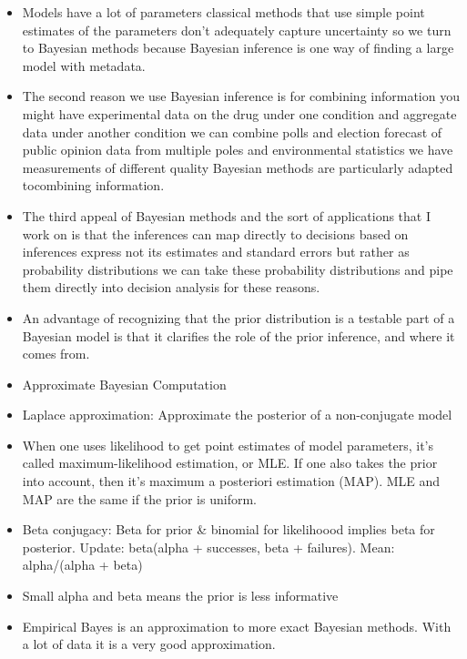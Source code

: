 \documentclass[]{book}
\theoremstyle{definition}
\theoremstyle{definition}
\theoremstyle{definition}
\theoremstyle{remark}
\begin{document}
\begin{itemize}
\item
  Models have a lot of parameters classical methods that use simple
  point estimates of the parameters don't adequately capture uncertainty
  so we turn to Bayesian methods because Bayesian inference is one way
  of finding a large model with metadata.
\item
  The second reason we use Bayesian inference is for combining
  information you might have experimental data on the drug under one
  condition and aggregate data under another condition we can combine
  polls and election forecast of public opinion data from multiple poles
  and environmental statistics we have measurements of different quality
  Bayesian methods are particularly adapted tocombining information.
\item
  The third appeal of Bayesian methods and the sort of applications that
  I work on is that the inferences can map directly to decisions based
  on inferences express not its estimates and standard errors but rather
  as probability distributions we can take these probability
  distributions and pipe them directly into decision analysis for these
  reasons.
\item
  An advantage of recognizing that the prior distribution is a testable
  part of a Bayesian model is that it clarifies the role of the prior
  inference, and where it comes from.
\item
  Approximate Bayesian Computation
\item
  Laplace approximation: Approximate the posterior of a non-conjugate
  model
\item
  When one uses likelihood to get point estimates of model parameters,
  it's called maximum-likelihood estimation, or MLE. If one also takes
  the prior into account, then it's maximum a posteriori estimation
  (MAP). MLE and MAP are the same if the prior is uniform.
\item
  Beta conjugacy: Beta for prior \& binomial for likelihoood implies
  beta for posterior. Update: beta(alpha + successes, beta + failures).
  Mean: alpha/(alpha + beta)
\item
  Small alpha and beta means the prior is less informative
\item
  Empirical Bayes is an approximation to more exact Bayesian methods.
  With a lot of data it is a very good approximation.
\end{itemize}
\end{document}
